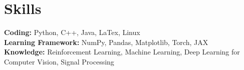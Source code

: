 
\section{Skills}


\textbf{Coding:} Python, C++, Java, LaTex, Linux\\
\textbf{Learning Framework:} NumPy, Pandas, Matplotlib, Torch, JAX\\
\textbf{Knowledge:} Reinforcement Learning, Machine Learning, Deep Learning for Computer Vision, Signal Processing